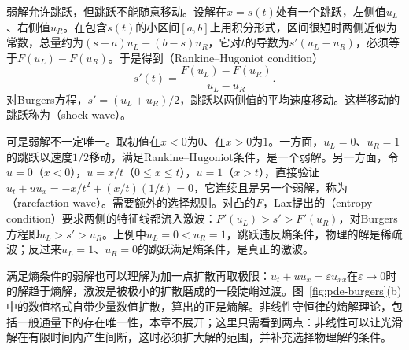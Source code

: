 弱解允许跳跃，但跳跃不能随意移动。设解在$x=s(t)$处有一个跳跃，左侧值$u_L$、右侧值$u_R$。在包含$s(t)$的小区间$[a,b]$上用积分形式，区间很短时两侧近似为常数，总量约为$(s-a)u_L+(b-s)u_R$，它对$t$的导数为$s'(u_L-u_R)$，必须等于$F(u_L)-F(u_R)$。于是得到（Rankine--Hugoniot condition）
\[
  s'(t)=\frac{F(u_L)-F(u_R)}{u_L-u_R} .
\]
对Burgers方程，$s'=(u_L+u_R)/2$，跳跃以两侧值的平均速度移动。这样移动的跳跃称为（shock wave）。

可是弱解不一定唯一。取初值在$x<0$为$0$、在$x>0$为$1$。一方面，$u_L=0$、$u_R=1$的跳跃以速度$1/2$移动，满足Rankine--Hugoniot条件，是一个弱解。另一方面，令$u=0$（$x<0$），$u=x/t$（$0\leq x\leq t$），$u=1$（$x>t$），直接验证$u_t+uu_x=-x/t^2+(x/t)(1/t)=0$，它连续且是另一个弱解，称为（rarefaction wave）。需要额外的选择规则。对凸的$F$，Lax提出的（entropy condition）要求两侧的特征线都流入激波：$F'(u_L)>s'>F'(u_R)$，对Burgers方程即$u_L>s'>u_R$。上例中$u_L=0<u_R=1$，跳跃违反熵条件，物理的解是稀疏波；反过来$u_L=1$、$u_R=0$的跳跃满足熵条件，是真正的激波。

满足熵条件的弱解也可以理解为加一点扩散再取极限：$u_t+uu_x=\varepsilon u_{xx}$在$\varepsilon\to0$时的解趋于熵解，激波是被极小的扩散磨成的一段陡峭过渡。图~\ref{fig:pde-burgers}(b)中的数值格式自带少量数值扩散，算出的正是熵解。非线性守恒律的熵解理论，包括一般通量下的存在唯一性，本章不展开；这里只需看到两点：非线性可以让光滑解在有限时间内产生间断，这时必须扩大解的范围，并补充选择物理解的条件。
